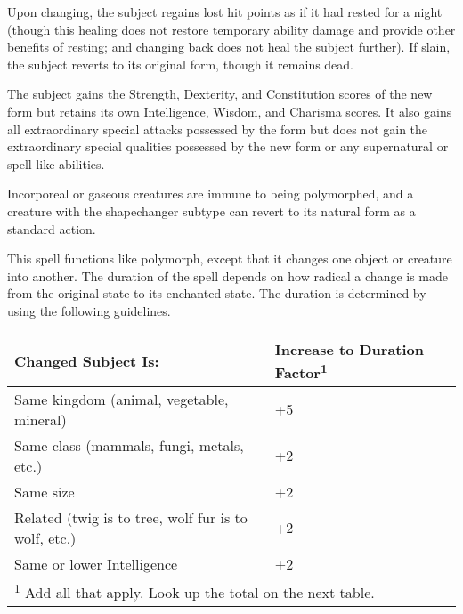 \begin{multicols}{2}
\begin{small}
\smallskip\noindent Upon changing, the subject regains lost hit points as if it had rested for a night (though this healing does not restore temporary ability damage and provide other benefits of resting; and changing back does not heal the subject further). If slain, the subject reverts to its original form, though it remains dead.

\smallskip\noindent The subject gains the Strength, Dexterity, and Constitution scores of the new form but retains its own Intelligence, Wisdom, and Charisma scores. It also gains all extraordinary special attacks possessed by the form but does not gain the extraordinary special qualities possessed by the new form or any supernatural or spell-like abilities.

\smallskip\noindent Incorporeal or gaseous creatures are immune to being polymorphed, and a creature with the shapechanger subtype can revert to its natural form as a standard action.


\noindent This spell functions like polymorph, except that it changes one object or creature into another. The duration of the spell depends on how radical a change is made from the original state to its enchanted state. The duration is determined by using the following guidelines.

\begin{center}
\begin{tabular}[h!]{p{1.5in}|p{1.5in}}
Changed Subject Is: & Increase to Duration Factor\textsuperscript{1} \\ \hline
Same kingdom (animal, vegetable, mineral) & +5 \\
Same class (mammals, fungi, metals, etc.) & +2 \\
Same size & +2 \\
Related (twig is to tree, wolf fur is to wolf, etc.) & +2	 \\
Same or lower Intelligence & +2 \\
\multicolumn{2}{p{3in}}{\textsuperscript{1} Add all that apply. Look up the total on the next table.} \\
\end{tabular}
\end{center}
  

\end{small}
\end{multicols}
